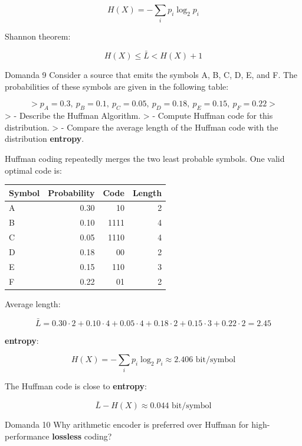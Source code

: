$$
H(X)=-\sum_i p_i \log_2 p_i
$$


Shannon theorem:


$$
H(X) \le \bar{L} < H(X)+1
$$




\begin{questionbox}{Domanda 9}
Consider a source that emits the symbols A, B, C, D, E, and F. The probabilities of these symbols are given in the following table:
\end{questionbox}

$$
> p_A=0.3,\ p_B=0.1,\ p_C=0.05,\ p_D=0.18,\ p_E=0.15,\ p_F=0.22
> $$
> - Describe the Huffman Algorithm.
> - Compute Huffman code for this distribution.
> - Compare the average length of the Huffman code with the distribution \textbf{entropy}.

Huffman coding repeatedly merges the two least probable symbols. One valid optimal code is:


\begin{center}
\begin{tabular}{ | l | r | r | r | }
\hline
\textbf{Symbol} & \textbf{Probability} & \textbf{Code} & \textbf{Length} \\
\hline
A & 0.30 & 10 & 2 \\
\hline
B & 0.10 & 1111 & 4 \\
\hline
C & 0.05 & 1110 & 4 \\
\hline
D & 0.18 & 00 & 2 \\
\hline
E & 0.15 & 110 & 3 \\
\hline
F & 0.22 & 01 & 2 \\
\hline
\end{tabular}
\end{center}
Average length:


$$
\bar{L}=0.30\cdot2+0.10\cdot4+0.05\cdot4+0.18\cdot2+0.15\cdot3+0.22\cdot2 = 2.45
$$


\textbf{entropy}:


$$
H(X)=-\sum_i p_i\log_2 p_i \approx 2.406 \text{ bit/symbol}
$$


The Huffman code is close to \textbf{entropy}:


$$
\bar{L}-H(X) \approx 0.044 \text{ bit/symbol}
$$




\begin{questionbox}{Domanda 10}
Why arithmetic encoder is preferred over Huffman for high-performance \textbf{lossless} coding?
\end{questionbox}


